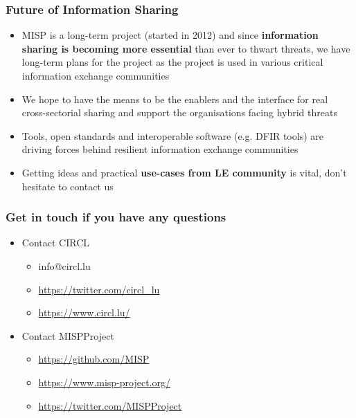 \begin{frame}
        \frametitle{Future of Information Sharing}
        \begin{itemize}
        \item MISP is a long-term project (started in 2012) and since {\bf information sharing is becoming more essential} than ever to thwart threats, we have long-term plans for the project as the project is used in various critical information exchange communities
        \item We hope to have the means to be the enablers and the interface for real cross-sectorial sharing and support the organisations facing hybrid threats
        \item Tools, open standards and interoperable software (e.g. DFIR tools) are driving forces behind resilient information exchange communities
        \item Getting ideas and practical {\bf use-cases from LE community} is vital, don't hesitate to contact us
        \end{itemize}
\end{frame}


\begin{frame}
  \frametitle{Get in touch if you have any questions}
  \begin{itemize}
    \item Contact CIRCL
    \begin{itemize}
      \item info@circl.lu
      \item \url{https://twitter.com/circl_lu}
      \item \url{https://www.circl.lu/}
    \end{itemize}
    \item Contact MISPProject
    \begin{itemize}
      \item \url{https://github.com/MISP}
      \item \url{https://www.misp-project.org/}
      \item \url{https://twitter.com/MISPProject}
    \end{itemize}
  \end{itemize}
\end{frame}

